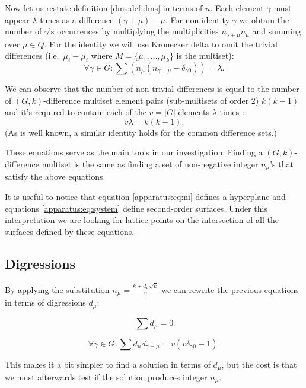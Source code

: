     Now let us restate definition \ref{dms:def:dms} in terms of $n$. Each element $\gamma$ must appear $\lambda$ times as a difference $(\gamma+\mu)-\mu$. For non-identity $\gamma$ we obtain the number of $\gamma$'s occurrences by multiplying the multiplicities $n_{\gamma+\mu} n_\mu$ and summing over $\mu \in Q$. For the identity we will use Kronecker delta to omit the trivial differences (i.e.\ $\mu_i-\mu_i$ where $M=\{\mu_1,\ldots,\mu_k\}$ is the multiset):
    \begin{equation}
        \label{apparatus:eq:system}
        \forall \gamma \in G \colon \sum (n_\mu(n_{\gamma+\mu}-\delta_{\gamma0})) = \lambda.
    \end{equation}
    
    We can observe that the number of non-trivial differences is equal to the number of $(G,k)$-difference multiset element pairs (sub-multisets of order $2$) $k(k-1)$ and it's required to contain each of the $v=|G|$ elements $\lambda$ times \cite{buratti1999old}:
    \begin{equation}
        \label{apparatus:eq:parameters}
        v\lambda = k(k-1).
    \end{equation}
(As is well known, a similar identity holds for the common difference sets.)
    
    These equations serve as the main tools in our investigation. Finding a $(G,k)$-difference multiset is the same as finding a set of non-negative integer $n_\mu$'s that satisfy the above equations. 
    
    It is useful to notice that equation \eqref{apparatus:eq:ni} defines a hyperplane and equations \eqref{apparatus:eq:system} define second-order surfaces. Under this interpretation we are looking for lattice points on the intersection of all the surfaces defined by these equations.

\subsection{Digressions}
\label{sec:digressions}
    By applying the substitution $n_\mu=\frac{k+d_\mu \sqrt k}v$ we can rewrite the previous equations in terms of digressions $d_\mu$:
    
    \begin{equation}
        \label{apparatus:eq:di}
        \sum {d_\mu} = 0
    \end{equation}
    
    \begin{equation}
        \label{apparatus:eq:dsystem}
        \forall \gamma \in G \colon \sum d_\mu d_{\gamma+\mu} = v (v \delta_{\gamma0}-1).
    \end{equation}
    
    This makes it a bit simpler to find a solution in terms of $d_\mu$, but the cost is that we must afterwards test if the solution produces integer $n_\mu$.
    
